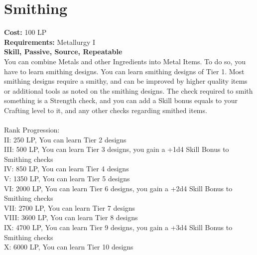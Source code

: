 \section{Smithing}\label{perk:smithing}
\textbf{Cost:} 100 LP\\
\textbf{Requirements:} Metallurgy I\\
\textbf{Skill, Passive, Source, Repeatable}\\
You can combine Metals and other Ingredients into Metal Items.
To do so, you have to learn smithing designs.
You can learn smithing designs of Tier 1.
Most smithing designs require a smithy, and can be improved by higher quality items or additional tools as noted on the smithing designs.
The check required to smith something is a Strength check, and you can add a Skill bonus equals to your Crafting level to it, and any other checks regarding smithed items.\\
\\
Rank Progression:\\
II: 250 LP, You can learn Tier 2 designs\\
III: 500 LP, You can learn Tier 3 designs, you gain a +1d4 Skill Bonus to Smithing checks\\
IV: 850 LP, You can learn Tier 4 designs\\
V: 1350 LP, You can learn Tier 5 designs\\
VI: 2000 LP, You can learn Tier 6 designs, you gain a +2d4 Skill Bonus to Smithing checks\\
VII: 2700 LP, You can learn Tier 7 designs\\
VIII: 3600 LP, You can learn Tier 8 designs\\
IX: 4700 LP, You can learn Tier 9 designs, you gain a +3d4 Skill Bonus to Smithing checks\\
X: 6000 LP, You can learn Tier 10 designs\\